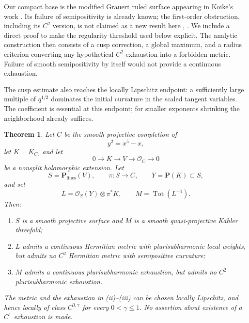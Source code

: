 \documentclass[11pt]{amsart}
\newtheorem{theorem}{Theorem}[section]
\theoremstyle{definition}
\theoremstyle{remark}
\numberwithin{equation}{section}
\newcommand{\PP}{\mathbf P}
\newcommand{\OO}{\mathcal O}
\newcommand{\Tot}{\operatorname{Tot}}
\begin{document}
Our compact base is the modified Grauert ruled surface appearing in
Koike's work \cite[Example~4.1]{Koike2021}. Its failure of semipositivity
is already known; the first-order obstruction, including its $C^2$
version, is not claimed as a new result here
\cite[Theorem~1.4 and Example~4.1]{Koike2021},
\cite[Remark~2.8]{Wu2026}. We include a direct proof to make the
regularity threshold used below explicit. The analytic construction
then consists of a cusp correction, a global maximum, and a radius
criterion converting any hypothetical $C^2$ exhaustion into a
forbidden metric. Failure of smooth semipositivity by itself would
not provide a continuous exhaustion.

The cusp estimate also reaches the locally Lipschitz endpoint: a
sufficiently large multiple of $q^{1/2}$ dominates the initial
curvature in the scaled tangent variables. The coefficient is
essential at this endpoint; for smaller exponents shrinking the
neighborhood already suffices.

\begin{theorem}\label{thm:main}
Let $C$ be the smooth projective completion of
\[
 y^2=x^5-x,
\]
let $K=K_C$, and let
\begin{equation}\label{eq:extension-intro}
 0\longrightarrow K\longrightarrow V\longrightarrow\OO_C
 \longrightarrow0
\end{equation}
be a nonsplit holomorphic extension. Let
\[
 S=\PP_{\mathrm{lines}}(V),\qquad
 \pi:S\longrightarrow C,\qquad
 Y=\PP(K)\subset S,
\]
and set
\begin{equation}\label{eq:main-line}
 L=\OO_S(Y)\otimes\pi^*K,\qquad M=\Tot(L^{-1}).
\end{equation}
Then:
\begin{enumerate}[label=\textup{(\roman*)},leftmargin=2.5em]
 \item $S$ is a smooth projective surface and $M$ is a smooth
 quasi-projective K\"ahler threefold;
 \item $L$ admits a continuous Hermitian metric with plurisubharmonic
 local weights, but admits no $C^2$ Hermitian metric with semipositive
 curvature;
 \item $M$ admits a continuous plurisubharmonic exhaustion, but admits
 no $C^2$ plurisubharmonic exhaustion.
\end{enumerate}
The metric and the exhaustion in \textup{(ii)--(iii)} can be chosen
locally Lipschitz, and hence locally of class $C^{0,\gamma}$ for every
$0<\gamma\le1$. No assertion about existence of a $C^1$ exhaustion
is made.
\end{theorem}
\end{document}

